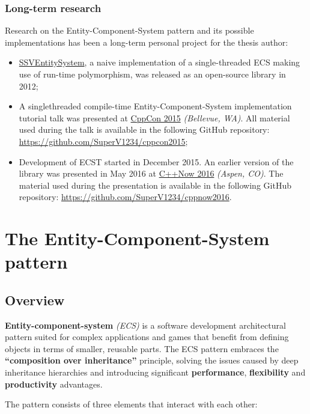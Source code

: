 \documentclass[oneside, 12pt, a4paper, openany]{book}
\begin{document}
\section{Long-term research}\label{long-term-research}

Research on the Entity-Component-System pattern and its possible
implementations has been a long-term personal project for the thesis
author:

\begin{itemize}
\item
  \href{https://github.com/SuperV1234/SSVEntitySystem}{SSVEntitySystem},
  a naive implementation of a single-threaded ECS making use of run-time
  polymorphism, was released as an open-source library in 2012;
\item
  A singlethreaded compile-time Entity-Component-System implementation
  tutorial talk was presented at \href{http://cppcon.org}{CppCon 2015}
  \emph{(Bellevue, WA)}. All material used during the talk is available
  in the following GitHub repository:
  \url{https://github.com/SuperV1234/cppcon2015};
\item
  Development of ECST started in December 2015. An earlier version of
  the library was presented in May 2016 at
  \href{http://cppnow.org}{C++Now 2016} \emph{(Aspen, CO)}. The material
  used during the presentation is available in the following GitHub
  repository: \url{https://github.com/SuperV1234/cppnow2016}.
\end{itemize}

\part{The Entity-Component-System pattern}

\hypertarget{ecs_part_overview}{\chapter{Overview}\label{ecs_part_overview}}

\textbf{Entity-component-system} \emph{(ECS)} is a software development
architectural pattern suited for complex applications and games that
benefit from defining objects in terms of smaller, reusable parts. The
ECS pattern embraces the \textbf{``composition over inheritance''}
principle, solving the issues caused by deep inheritance hierarchies and
introducing significant \textbf{performance}, \textbf{flexibility} and
\textbf{productivity} advantages.

The pattern consists of three elements that interact with each other:
\end{document}
